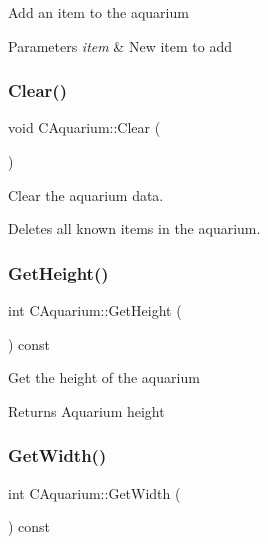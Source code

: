 Add an item to the aquarium 
\begin{DoxyParams}{Parameters}
{\em item} & New item to add \\
\hline
\end{DoxyParams}
\mbox{\label{class_c_aquarium_adc9e22446b161ec23acdef368cb8ac2e}} 
\subsubsection{\texorpdfstring{Clear()}{Clear()}}
{\footnotesize\ttfamily void C\+Aquarium\+::\+Clear (\begin{DoxyParamCaption}{ }\end{DoxyParamCaption})}

Clear the aquarium data.

Deletes all known items in the aquarium. \mbox{\label{class_c_aquarium_a6553dfa3238a4e731dbdbe0ccd6ce956}} 
\subsubsection{\texorpdfstring{Get\+Height()}{GetHeight()}}
{\footnotesize\ttfamily int C\+Aquarium\+::\+Get\+Height (\begin{DoxyParamCaption}{ }\end{DoxyParamCaption}) const\hspace{0.3cm}{\ttfamily [inline]}}

Get the height of the aquarium \begin{DoxyReturn}{Returns}
Aquarium height 
\end{DoxyReturn}
\mbox{\label{class_c_aquarium_a002b101c76d468db423da85b9eb56210}} 
\subsubsection{\texorpdfstring{Get\+Width()}{GetWidth()}}
{\footnotesize\ttfamily int C\+Aquarium\+::\+Get\+Width (\begin{DoxyParamCaption}{ }\end{DoxyParamCaption}) const\hspace{0.3cm}{\ttfamily [inline]}}

